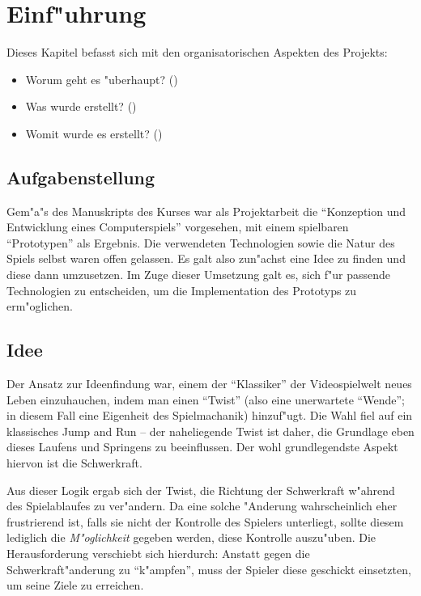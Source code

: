 \section{Einf"uhrung}
\label{sec:intro}
%
Dieses Kapitel befasst sich mit den organisatorischen Aspekten des Projekts:
\begin{itemize}
	\item
		Worum geht es "uberhaupt? ()
	\item
		Was wurde erstellt? ()
	\item
		Womit wurde es erstellt? ()
\end{itemize}
%
\subsection{Aufgabenstellung}
\label{sec:intro/requirements}
%
Gem"a"s des Manuskripts des Kurses war als Projektarbeit die ``Konzeption und Entwicklung
eines Computerspiels'' vorgesehen, mit einem spielbaren ``Prototypen'' als Ergebnis. Die
verwendeten Technologien sowie die Natur des Spiels selbst waren offen gelassen. Es galt
also zun"achst eine Idee zu finden und diese dann umzusetzen. Im Zuge dieser Umsetzung
galt es, sich f"ur passende Technologien zu entscheiden, um die Implementation des
Prototyps zu erm"oglichen.
%
\subsection{Idee}
\label{sec:intro/idea}
Der Ansatz zur Ideenfindung war, einem der ``Klassiker'' der Videospielwelt neues
Leben einzuhauchen, indem man einen ``Twist'' (also eine unerwartete ``Wende'';
in diesem Fall eine Eigenheit des Spielmachanik) hinzuf"ugt. Die Wahl fiel auf
ein klassisches Jump and Run -- der naheliegende Twist ist daher, die Grundlage eben
dieses Laufens und Springens zu beeinflussen. Der wohl grundlegendste Aspekt hiervon
ist die Schwerkraft.

Aus dieser Logik ergab sich der Twist, die Richtung der Schwerkraft w"ahrend des
Spielablaufes zu ver"andern. Da eine solche "Anderung wahrscheinlich eher frustrierend
ist, falls sie nicht der Kontrolle des Spielers unterliegt, sollte diesem lediglich
die \textit{M"oglichkeit} gegeben werden, diese Kontrolle auszu"uben. Die Herausforderung
verschiebt sich hierdurch: Anstatt gegen die Schwerkraft"anderung zu ``k"ampfen'',
muss der Spieler diese geschickt einsetzten, um seine Ziele zu erreichen.

